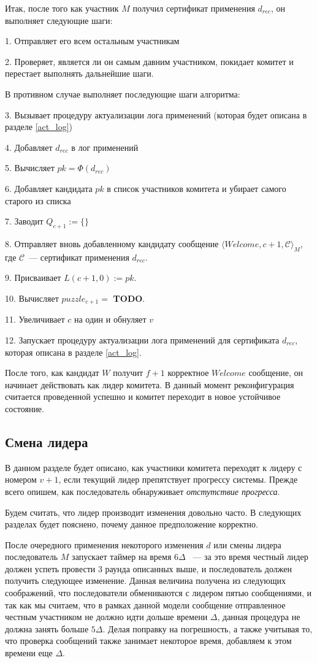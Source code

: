 Итак, после того как участник $M$ получил сертификат применения $d_{rec}$, он выполняет следующие шаги:

1. Отправляет его всем остальным участникам

2. Проверяет, является ли он самым давним участником, покидает комитет и перестает выполнять дальнейшие шаги. 

В противном случае выполняет последующие шаги алгоритма:

3. Вызывает процедуру актуализации лога применений (которая будет описана в разделе \ref{act_log})

4. Добавляет $d_{rec}$ в лог применений

5. Вычисляет $pk=\Phi(d_{rec})$

6. Добавляет кандидата $pk$ в список участников комитета и убирает самого старого из списка

7. Заводит $Q_{c+1} := \{\}$

8. Отправляет вновь добавленному кандидату сообщение $\langle Welcome, c+1, \mathcal{C} \rangle_M$, где $\mathcal{C}$~--- сертификат применения $d_{rec}$.

9. Присваивает $L(c+1, 0):=pk$.

10. Вычисляет $puzzle_{c+1}=$ \textbf{TODO}.

11. Увеличивает $c$ на один и обнуляет $v$

12. Запускает процедуру актуализации лога применений для сертификата $d_{rec}$, которая описана в разделе \ref{act_log}.

После того, как кандидат $W$ получит $f+1$ корректное $Welcome$ сообщение, он начинает действовать как лидер комитета. В данный момент реконфигурация считается проведенной успешно и комитет переходит в новое устойчивое состояние.

\subsection{Смена лидера} \label{leader-change}
В данном разделе будет описано, как участники комитета переходят к лидеру с номером $v+1$, если текущий лидер препятствует прогрессу системы. Прежде всего опишем, как последователь обнаруживает \textit{отстутствие прогресса}.

Будем считать, что лидер производит изменения довольно часто. В следующих разделах будет пояснено, почему данное предположение корректно.

После очередного применения некоторого изменения $d$ или смены лидера последователь $M$ запускает таймер на время $6\Delta$ ~--- за это время честный лидер должен успеть провести 3 раунда описанных выше, и последователь должен получить следующее изменение.
Данная величина получена из следующих соображений, что последователи обмениваются с лидером пятью сообщениями, и так как мы считаем, что в рамках данной модели сообщение отправленное честным участником не должно идти дольше времени $\Delta$, данная процедура не должна занять больше $5\Delta$. Делая поправку на погрешность, а также учитывая то, что проверка сообщений также занимает некоторое время, добавляем к этом времени еще $\Delta$.

